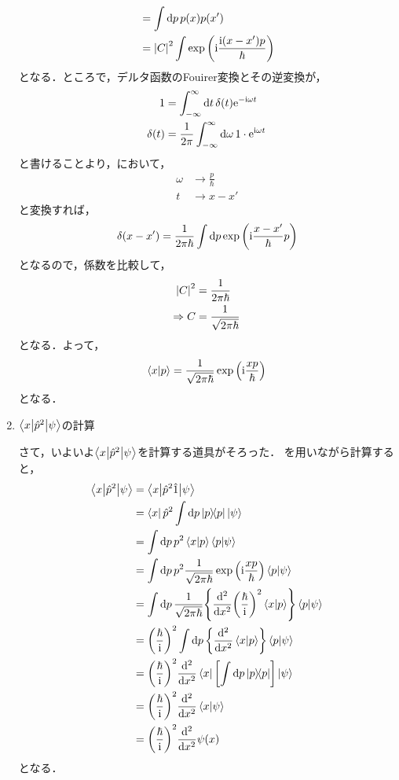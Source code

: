 \documentclass{report}
\begin{document}
\begin{enumerate}
\begin{align}
          &= \int\dd{p}p(x)p(x') \\ 
          &= \abs{C}^2\int\exp\qty(\mathrm{i}\frac{\mathrm{i}\qty(x - x')p}{\hbar})
        \end{align}
        となる．ところで，デルタ函数のFouirer変換とその逆変換が，
        \begin{align}
          1 &= \int_{-\infty}^{\infty}\dd{t}\delta(t)\mathrm{e}^{-\mathrm{i}\omega t} \\ 
          \delta(t) &= \frac{1}{2\pi}\int_{-\infty}^{\infty}\dd{\omega}1\cdot\mathrm{e}^{\mathrm{i}\omega t}\label{delta-fourier-inv}
        \end{align}
        と書けることより，において，
        \begin{align}
          \omega &\to \frac{p}{\hbar} \\ 
          t &\to x - x'
        \end{align}
        と変換すれば，
        \begin{align}
          \delta(x - x') = \frac{1}{2\pi\hbar}\int\dd{p}\exp\qty(\mathrm{i}\frac{x - x'}{\hbar}p)
        \end{align}
        となるので，係数を比較して，
        \begin{align}
          \abs{C}^2 &= \frac{1}{2\pi\hbar} \\ 
          \Rightarrow C &= \frac{1}{\sqrt{2\pi\hbar}} 
        \end{align}
        となる．よって，
        \begin{align}
          \braket{x}{p} = \frac{1}{\sqrt{2\pi\hbar}}\exp\qty(\mathrm{i}\frac{xp}{\hbar})\label{braket-xp}
        \end{align}
        となる．
      \item $\mel**{x}{\hat{p}^2}{\psi}$の計算\par
        さて，いよいよ$\mel**{x}{\hat{p}^2}{\psi}$を計算する道具がそろった．
        を用いながら計算すると，
        \begin{align}
          \mel**{x}{\hat{p}^2}{\psi} &= \mel**{x}{\hat{p}^2\hat{1}}{\psi} \\
          &= \bra{x}\hat{p}^2\int\dd{p}\ketbra{p}{p}\ket{\psi} \\ 
          &= \int\dd{p}p^2\braket{x}{p}\braket{p}{\psi} \\ 
          &= \int\dd{p}p^2\frac{1}{\sqrt{2\pi\hbar}}\exp\qty(\mathrm{i}\frac{xp}{\hbar})\braket{p}{\psi} \\ 
          &= \int\dd{p}\frac{1}{\sqrt{2\pi\hbar}}\qty{\dv[2]{x}\qty(\frac{\hbar}{\mathrm{i}})^2\braket{x}{p}}\braket{p}{\psi} \\ 
          &= \qty(\frac{\hbar}{\mathrm{i}})^2\int\dd{p}\qty{\dv[2]{x}\braket{x}{p}}\braket{p}{\psi} \\ 
          &= \qty(\frac{\hbar}{\mathrm{i}})^2\dv[2]{x}\bra{x}\qty[\int\dd{p}\ketbra{p}{p}]\ket{\psi} \\ 
          &= \qty(\frac{\hbar}{\mathrm{i}})^2\dv[2]{x}\braket{x}{\psi} \\
          &= \qty(\frac{\hbar}{\mathrm{i}})^2\dv[2]{x}\psi(x)\label{before-schrodinger-oscillator}
        \end{align}
        となる．
    \end{enumerate}
\end{document}
